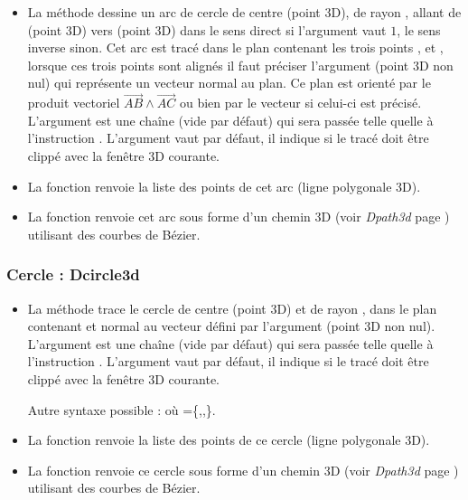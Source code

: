 \begin{itemize}
    \item La méthode  dessine un arc de cercle de centre  (point 3D), de rayon , allant de  (point 3D) vers  (point 3D) dans le sens direct si l'argument  vaut $1$, le sens inverse sinon. Cet arc est tracé dans le plan contenant les trois points ,  et , lorsque ces trois points sont alignés il faut préciser l'argument  (point 3D non nul) qui représente un vecteur normal au plan. Ce plan est orienté par le produit vectoriel $\vec{AB}\wedge\vec{AC}$ ou bien par le vecteur  si celui-ci est précisé. L'argument  est une chaîne (vide par défaut) qui sera passée telle quelle à l'instruction \drawcmd . L'argument  vaut \false par défaut, il indique si le tracé doit être clippé avec la fenêtre 3D courante.
    
    \item La fonction  renvoie la liste des points de cet arc (ligne polygonale 3D). 
    
    \item La fonction  renvoie cet arc sous forme d'un chemin 3D (voir \emph{Dpath3d} page \pageref{Dpath3d}) utilisant des courbes de Bézier.
\end{itemize}

\subsubsection{Cercle : Dcircle3d}

\begin{itemize}
    \item La méthode  trace le cercle de centre  (point 3D) et de rayon , dans le plan contenant  et normal au vecteur défini par l'argument  (point 3D non nul). L'argument  est une chaîne (vide par défaut) qui sera passée telle quelle à l'instruction \drawcmd . L'argument  vaut \false par défaut, il indique si le tracé doit être clippé avec la fenêtre 3D courante. 
    
    Autre syntaxe possible :   où =\{,,\}.
    
    \item La fonction  renvoie la liste des points de ce cercle (ligne polygonale 3D). 
    
    \item La fonction  renvoie ce cercle sous forme d'un chemin 3D (voir \emph{Dpath3d} page \pageref{Dpath3d}) utilisant des courbes de Bézier.
\end{itemize}

